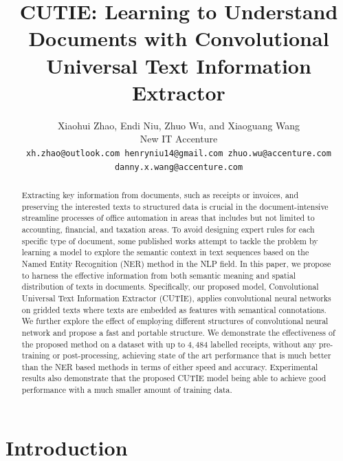 \documentclass[10pt,twocolumn,letterpaper]{article}
\begin{document}
\title{CUTIE: Learning to Understand Documents with Convolutional Universal Text Information Extractor}

\author{
  Xiaohui Zhao, Endi Niu, Zhuo Wu, and Xiaoguang Wang \\
  New IT Accenture \\
{\tt\small xh.zhao@outlook.com henryniu14@gmail.com zhuo.wu@accenture.com danny.x.wang@accenture.com}
}

\maketitle

\begin{abstract}
   Extracting key information from documents, such as receipts or invoices, and preserving the interested texts to structured data is crucial in the document-intensive streamline processes of office automation in areas that includes but not limited to accounting, financial, and taxation areas. To avoid designing expert rules for each specific type of document, some published works attempt to tackle the problem by learning a model to explore the semantic context in text sequences based on the Named Entity Recognition (NER) method in the NLP field. In this paper, we propose to harness the effective information from both semantic meaning and spatial distribution of texts in documents. Specifically, our proposed model, Convolutional Universal Text Information Extractor (CUTIE), applies convolutional neural networks on gridded texts where texts are embedded as features with semantical connotations. We further explore the effect of employing different structures of convolutional neural network and propose a fast and portable structure. We demonstrate the effectiveness of the proposed method on a dataset with up to $4,484$ labelled receipts, without any pre-training or post-processing, achieving state of the art performance that is much better than the NER based methods in terms of either speed and accuracy. Experimental results also demonstrate that the proposed CUTIE model being able to achieve good performance with a much smaller amount of training data.
\end{abstract}

\section{Introduction}
\end{document}
